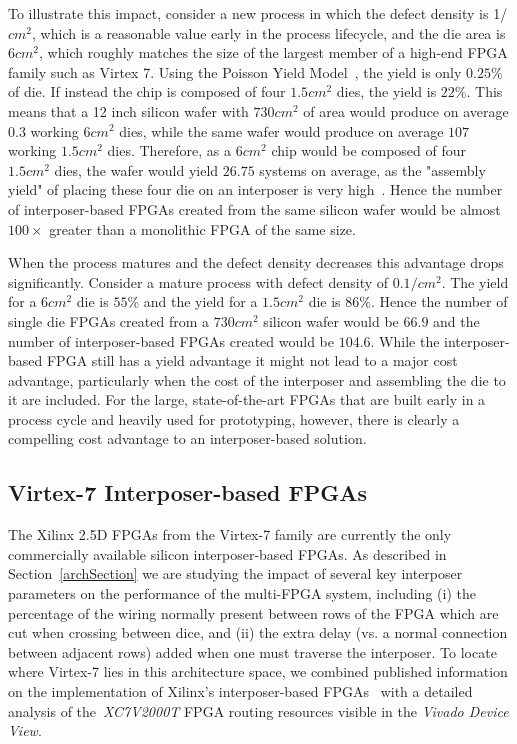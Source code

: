 \documentclass[journal]{IEEEtran}
\begin{document}
To illustrate this impact, consider a new process in which the defect density is 1/$cm^2$, which is a reasonable value early in the process lifecycle, and the die area is $6cm^2$, which roughly matches the size of the largest member of a high-end FPGA family such as Virtex 7. Using the Poisson Yield Model~\cite{yieldmodel}, the yield is only $0.25\%$ of die. If instead the chip is composed of four $1.5cm^2$ dies, the yield is $22\%$. This means that a 12 inch silicon wafer with $730cm^2$ of area would produce on average $0.3$ working $6cm^2$ dies, while the same wafer would produce on average $107$ working $1.5cm^2$ dies. Therefore, as a $6cm^2$ chip would be composed of four $1.5cm^2$ dies, the wafer would yield $26.75$ systems on average, as the "assembly yield" of placing these four die on an interposer is very high~\cite{xilinxTSV}. Hence the number of interposer-based FPGAs created from the same silicon wafer would be almost $100\times$ greater than a monolithic FPGA of the same size.

When the process matures and the defect density decreases this advantage drops significantly. Consider a mature process with defect density of $0.1/cm^2$. The yield for a $6cm^2$ die is $55\%$ and the yield for a $1.5cm^2$ die is $86\%$. Hence the number of single die FPGAs created from a $730cm^2$ silicon wafer would be $66.9$ and the number of interposer-based FPGAs created would be $104.6$. While the interposer-based FPGA still has a yield advantage it might not lead to a major cost advantage, particularly when the cost of the interposer and assembling the die to it are included. For the large, state-of-the-art FPGAs that are built early in a process cycle and heavily used for prototyping, however, there is clearly a compelling cost advantage to an interposer-based solution.

\subsection{Virtex-7 Interposer-based FPGAs}
\label{virtex7section}

The Xilinx 2.5D FPGAs from the Virtex-7 family are currently the only commercially available silicon interposer-based FPGAs. As described in Section~\ref{archSection} we are studying the impact of several key interposer parameters on the performance of the multi-FPGA system, including (i) the percentage of the wiring normally present between rows of the FPGA which are cut when crossing between dice, and (ii) the extra delay (vs. a normal connection between adjacent rows) added when one must traverse the interposer.  To locate where Virtex-7 lies in this architecture space, we combined published information on the implementation of Xilinx's interposer-based FPGAs~\cite{xilinxTSV} with a detailed analysis of the~\textit{XC7V2000T} FPGA routing resources visible in the \textit{Vivado Device View}.
\end{document}
